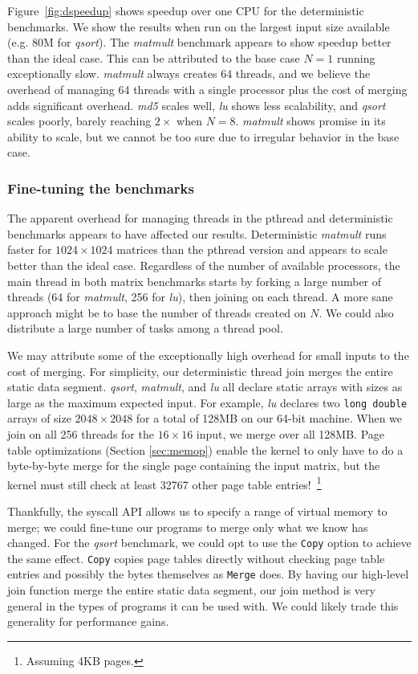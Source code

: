 
\mbox{Figure \ref{fig:dspeedup}} shows speedup over one CPU for the deterministic
benchmarks. We show the results when run on the largest input size available
(e.g. 80M for \emph{qsort}). The \emph{matmult} benchmark appears to show
speedup better than the ideal case. This can be attributed to the base case
$N=1$ running exceptionally slow. \emph{matmult} always creates 64 threads, and
we believe the overhead of managing 64 threads with a single processor plus the
cost of merging adds significant overhead. \emph{md5} scales well,
\emph{lu} shows less scalability, and \emph{qsort} scales poorly, barely
reaching $2\times$ when $N=8$. \emph{matmult} shows promise in its ability to
scale, but we cannot be too sure due to irregular behavior in the base case.

\subsubsection{Fine-tuning the benchmarks}
\label{sec:finetune}
The apparent overhead for managing threads in the pthread and deterministic
benchmarks appears to have affected our results. Deterministic \emph{matmult}
runs faster for $1024\times 1024$ matrices than the pthread version and appears
to scale better than the ideal case. Regardless of the number of available
processors, the main thread in both matrix benchmarks starts by forking a large
number of threads (64 for \emph{matmult}, 256 for \emph{lu}), then joining on
each thread. A more sane approach might be to base the number of threads created
on $N$. We could also distribute a large number of tasks among a thread pool.

We may attribute some of the exceptionally high overhead for small inputs to
the cost of merging. For simplicity, our deterministic thread join merges the
entire static data segment. \emph{qsort}, \emph{matmult}, and \emph{lu} all
declare static arrays with sizes as large as the maximum expected input. For
example, \emph{lu} declares two {\tt long double} arrays of size
$2048\times 2048$ for a total of 128MB on our 64-bit machine. When we join on
all 256 threads for the $16\times 16$ input, we merge over all 128MB. Page
table optimizations (Section \ref{sec:memop}) enable the kernel to only have to
do a \mbox{byte-by-byte} merge for the single page containing the input matrix,
but the kernel must still check at least 32767 other page table
entries!~\footnote{Assuming 4KB pages.}

Thankfully, the syscall API allows us to specify a range of virtual memory to
merge; we could fine-tune our programs to merge only what we know has changed.
For the \emph{qsort} benchmark, we could opt to use the {\tt Copy} option to
achieve the same effect. {\tt Copy} copies page tables directly without checking
page table entries and possibly the bytes themselves as {\tt Merge} does. By
having our high-level join function merge the entire static data segment, our
join method is very general in the types of programs it can be used with. We
could likely trade this generality for performance gains.


